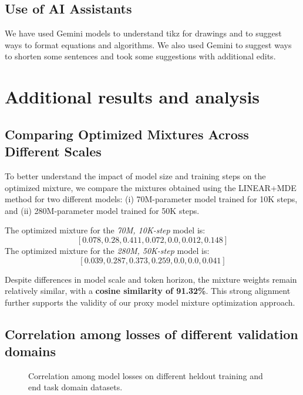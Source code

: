 \subsection{Use of AI Assistants}

We have used Gemini models to understand tikz for drawings and to suggest ways to format equations and algorithms. We also used Gemini to suggest ways to shorten some sentences and took some suggestions with additional edits.


\section{Additional results and analysis}

\label{sec:appendix_results}


\subsection{Comparing Optimized Mixtures Across Different Scales}

To better understand the impact of model size and training steps on the optimized mixture, we compare the mixtures obtained using the \textsc{LINEAR+MDE} method for two different models: (i) 70M-parameter model trained for 10K steps, and (ii) 280M-parameter model trained for 50K steps.

\vspace{0.5em} %

\noindent
The optimized mixture for the \textit{70M, 10K-step} model is:  
\[
[0.078, 0.28, 0.411, 0.072, 0.0, 0.012, 0.148]
\]
The optimized mixture for the \textit{280M, 50K-step} model is:
\[
[0.039, 0.287, 0.373, 0.259, 0.0, 0.0, 0.041]
\]

\noindent
Despite differences in model scale and token horizon, the mixture weights remain relatively similar, with a \textbf{cosine similarity of 91.32\%}. This strong alignment further supports the validity of our proxy model mixture optimization approach.

\subsection{Correlation among losses of different validation domains}

\begin{figure*}[htbp]
\vskip 0.2in
\begin{center}
\caption{Correlation among model losses on different heldout training and end task domain datasets.}
\label{fig:validation_loss_correlation}
\end{center}
\vskip -0.2in
\end{figure*}


